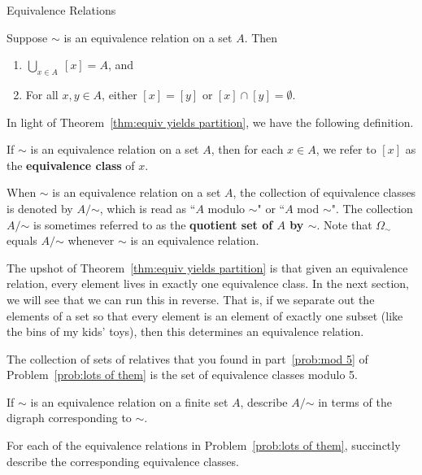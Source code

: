 \begin{section}{Equivalence Relations}
\begin{theorem}\label{thm:equiv yields partition}
Suppose $\sim$ is an equivalence relation on a set $A$.  Then
\begin{enumerate}[label=\textrm{(\alph*)}]
\item $\displaystyle \bigcup_{x\in A}\ [x]=A$, and
\item For all $x,y\in A$, either $[x]=[y]$ or $[x]\cap [y]=\emptyset$.
\end{enumerate}
\end{theorem}

In light of Theorem~\ref{thm:equiv yields partition}, we have the following definition.

\begin{definition}\label{def:equivalence class}
If $\sim$ is an equivalence relation on a set $A$, then for each $x\in A$, we refer to $[x]$ as the \textbf{equivalence class} of $x$.
\end{definition}

When $\sim$ is an equivalence relation on a set $A$, the collection of equivalence classes is denoted by $A/\mathord\sim$, which is read as ``$A$ modulo $\sim$" or ``$A$ mod $\sim$".  The collection $A/\mathord\sim$ is sometimes referred to as the \textbf{quotient set of $A$ by $\sim$}. Note that $\Omega_{\sim}$ equals $A/\mathord\sim$ whenever $\sim$ is an equivalence relation.

The upshot of Theorem~\ref{thm:equiv yields partition} is that given an equivalence relation, every element lives in exactly one equivalence class.  In the next section, we will see that we can run this in reverse.  That is, if we separate out the elements of a set so that every element is an element of exactly one subset (like the bins of my kids' toys), then this determines an equivalence relation.

\begin{example}
The collection of sets of relatives that you found in part~\ref{prob:mod 5} of Problem~\ref{prob:lots of them} is the set of equivalence classes modulo 5.
\end{example}

\begin{problem}
If $\sim$ is an equivalence relation on a finite set $A$, describe $A/\mathord\sim$ in terms of the digraph corresponding to $\sim$.
\end{problem}

\begin{problem}
For each of the equivalence relations in Problem~\ref{prob:lots of them}, succinctly describe the corresponding equivalence classes.
\end{problem}

\end{section}